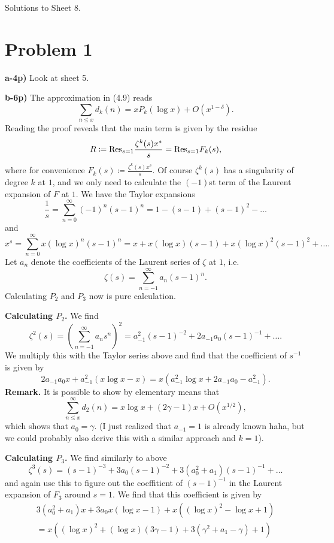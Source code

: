 \documentclass[a4paper,11pt]{article}
\author{Max von Consbruch}
\begin{document}
\begin{center}
    \huge{Solutions to Sheet 8.}
\end{center}

\section*{Problem 1}
\textbf{a-4p)} Look at sheet 5.

\textbf{b-6p)} The approximation in (4.9) reads 
\[
    \sum_{n \leq x} d_k(n) = x P_k(\log x) + O(x^{1-\delta}).
\]
Reading the proof reveals that the main term is given by the residue
\[
    R \coloneqq \mathrm{Res}_{s=1} \frac{\zeta^k(s) x^s}s = \mathrm{Res}_{s=1} F_k(s),
\]
where for convenience $F_k(s) \coloneqq \frac{\zeta^k(s) x^s}s.$
Of course $\zeta^k(s)$ has a singularity of degree $k$ at $1$, and we only need 
to calculate the $(-1)$st term of the Laurent expansion of $F$ at $1$. 
We have the Taylor expansions
\[
    \frac 1{s} =  \sum_{n=0}^\infty (-1)^n (s-1)^n = 1 - (s-1) + (s-1)^2 - \dots
\]
and
\[
    x^s = \sum_{n=0}^\infty x(\log x)^n (s-1)^n = x + x(\log x)(s-1) + x(\log x)^2(s-1)^2 + \dots. 
\]
Let $a_n$ denote the coefficients of the Laurent series of $\zeta$ at $1$, i.e.
\[
    \zeta(s) = \sum_{n = -1}^\infty a_n (s-1)^n.
\]
Calculating $P_2$ and $P_3$ now is pure calculation. 

\textbf{Calculating $P_2$.} We find
\[
    \zeta^2(s) = \left( \sum_{n=-1}^\infty a_n s^n \right)^2
    = a_{-1}^2 (s-1)^{-2} + 2a_{-1}a_0 (s-1)^{-1} + \dots.
\]
We multiply this with the Taylor series above and find that the coefficient of 
$s^{-1}$ is given by 
\[
    2a_{-1}a_0 x + a_{-1}^2 (x \log x - x) = x ( a_{-1}^2 \log x + 2a_{-1}a_0-a_{-1}^2).
\]
\textbf{Remark.} It is possible to show by elementary means that 
\[
    \sum_{n\leq x}^\infty d_2(n) = x \log x + (2\gamma-1)x + O(x^{1/2}),
\]
which shows that $a_0 = \gamma$. (I just realized that $a_{-1} = 1$ is already
known haha, but we could probably also derive this with a similar approach and
$k=1$).

\textbf{Calculating $P_3$.} We find similarly to above
\[
    \zeta^3(s) = (s-1)^{-3} + 3a_0 (s-1)^{-2} + 3(a_0^2 + a_1)(s-1)^{-1} + \dots
\]
and again use this to figure out the coeffitient of $(s-1)^{-1}$ in the 
Laurent expansion of $F_3$ around $s=1$. We find that this coefficient is given by
\begin{multline*}
    3(a_0^2 + a_1)x + 3a_0x ( \log x - 1) + x ((\log x)^2 - \log x + 1) \\
    = x ( (\log x)^2 + (\log x)(3 \gamma - 1) + 3 (\gamma^2 + a_1 - \gamma) + 1)
\end{multline*}
\end{document}
